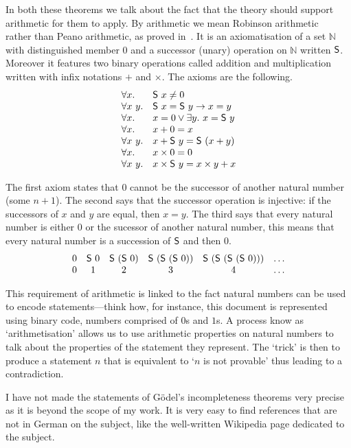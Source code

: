 In both these theorems we talk about the fact that the theory should support
arithmetic for them to apply. By arithmetic we mean Robinson
arithmetic~ rather than Peano arithmetic,
as proved in~.
It is an axiomatisation of a set \(\mathbb{N}\) with distinguished member
\(0\) and a successor (unary) operation on \(\mathbb{N}\) written \(\mathsf{S}\).
Moreover it features two binary operations called addition and multiplication
written with infix notations \(+\) and \(\times\).
The axioms are the following.
\[
  \begin{array}{ll}
    \forall x.& \mathsf{S}\ x \not= 0 \\
    \forall x\ y.& \mathsf{S}\ x = \mathsf{S}\ y \to x = y \\
    \forall x.& x = 0 \vee \exists y.\ x = \mathsf{S}\ y \\
    \forall x.& x + 0 = x \\
    \forall x\ y.& x + \mathsf{S}\ y = \mathsf{S}\ (x + y) \\
    \forall x.& x \times 0 = 0 \\
    \forall x\ y.& x \times \mathsf{S}\ y = x \times y + x
  \end{array}
\]

The first axiom states that \(0\) cannot be the successor of another natural
number (\ie some \(n + 1\)). The second says that the successor operation is
injective: if the successors of \(x\) and \(y\) are equal, then \(x = y\).
The third says that every natural number is either \(0\) or the sucessor of
another natural number, this means that every natural number is a succession of
\(\mathsf{S}\) and then \(0\).
\[
  \begin{array}{cccccc}
    0 & \mathsf{S}\ 0 & \mathsf{S}\ (\mathsf{S}\ 0) & \mathsf{S}\ (\mathsf{S}\ (\mathsf{S}\ 0))
    & \mathsf{S}\ (\mathsf{S}\ (\mathsf{S}\ (\mathsf{S}\ 0)))
    & \dots \\
    0 & 1 & 2 & 3 & 4 & \dots
  \end{array}
\]

This requirement of arithmetic is linked to the fact natural numbers can be used
to encode statements---think how, for instance, this document is represented
using binary code, \ie numbers comprised of \(0\)s and \(1\)s. A process know as
`arithmetisation' allows us to use arithmetic properties on natural numbers to
talk about the properties of the statement they represent. The `trick' is then
to produce a statement \(n\) that is equivalent to `\(n\) is not provable' thus
leading to a contradiction.

I have not made the statements of Gödel's incompleteness theorems very precise
as it is beyond the scope of my work. It is very easy to find references that
are not in German on the subject, like the well-written Wikipedia page dedicated
to the subject.

